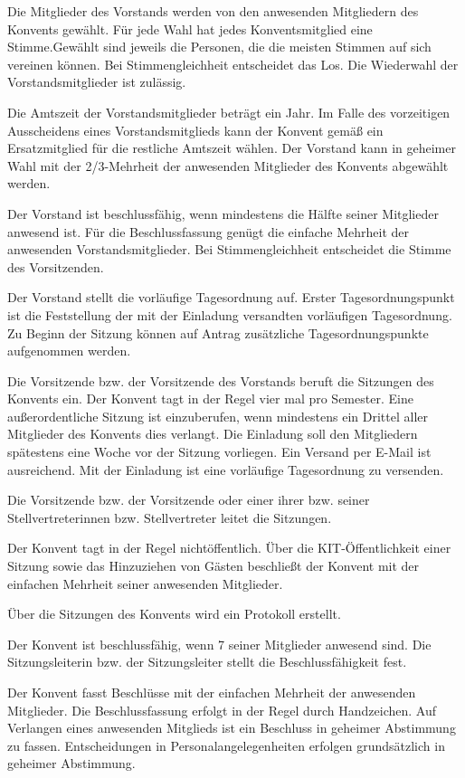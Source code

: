 \documentclass[a4paper, parskip=half, numbers=noenddot]{scrartcl}
\begin{document}
\begin{contract}
\label{wahl}
Die Mitglieder des Vorstands werden von den anwesenden Mitgliedern des Konvents gewählt. Für jede Wahl hat jedes Konventsmitglied eine Stimme.Gewählt sind jeweils die Personen, die die meisten Stimmen auf sich vereinen können. Bei Stimmengleichheit entscheidet das Los. Die Wiederwahl der Vorstandsmitglieder ist zulässig.

Die Amtszeit der Vorstandsmitglieder beträgt ein Jahr. Im Falle des vorzeitigen Ausscheidens
eines Vorstandsmitglieds kann der Konvent gemäß  ein Ersatzmitglied für die restliche Amtszeit wählen. Der Vorstand kann in geheimer Wahl mit der 2/3-Mehrheit der anwesenden Mitglieder des Konvents abgewählt werden.

Der Vorstand ist beschlussfähig, wenn mindestens die Hälfte seiner Mitglieder anwesend ist. Für die Beschlussfassung genügt die einfache Mehrheit der anwesenden Vorstandsmitglieder. Bei Stimmengleichheit entscheidet die Stimme des Vorsitzenden.


Der Vorstand stellt die vorläufige Tagesordnung auf. Erster Tagesordnungspunkt ist die Feststellung der mit der Einladung versandten vorläufigen Tagesordnung. Zu Beginn der Sitzung können auf Antrag zusätzliche Tagesordnungspunkte aufgenommen werden.

Die Vorsitzende bzw. der Vorsitzende des Vorstands beruft die Sitzungen des Konvents ein.
Der Konvent tagt in der Regel vier mal pro Semester. Eine außerordentliche Sitzung ist einzuberufen, wenn mindestens ein Drittel aller Mitglieder des Konvents dies verlangt. Die Einladung soll den Mitgliedern spätestens eine Woche vor der Sitzung vorliegen. Ein Versand per E-Mail ist ausreichend. Mit der Einladung ist eine vorläufige Tagesordnung zu versenden.

Die Vorsitzende bzw. der Vorsitzende oder einer ihrer bzw. seiner Stellvertreterinnen bzw. Stellvertreter leitet die Sitzungen.	

Der Konvent tagt in der Regel nichtöffentlich. Über die KIT-Öffentlichkeit einer Sitzung sowie das Hinzuziehen von Gästen beschließt der Konvent mit der einfachen Mehrheit seiner anwesenden Mitglieder.

Über die Sitzungen des Konvents wird ein Protokoll erstellt.

Der Konvent ist beschlussfähig, wenn 7 seiner Mitglieder anwesend sind. Die Sitzungsleiterin bzw. der Sitzungsleiter stellt die Beschlussfähigkeit fest.	

Der Konvent fasst Beschlüsse mit der einfachen Mehrheit der anwesenden Mitglieder. Die Beschlussfassung erfolgt in der Regel durch Handzeichen. Auf Verlangen eines anwesenden Mitglieds ist ein Beschluss in geheimer Abstimmung zu fassen. Entscheidungen in Personalangelegenheiten erfolgen grundsätzlich in geheimer Abstimmung.



\end{contract}
\end{document}
